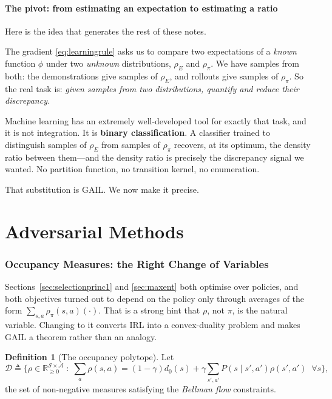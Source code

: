 \documentclass[11pt]{article}
\theoremstyle{plain}
\theoremstyle{definition}
\newtheorem{definition}[theorem]{Definition}
\theoremstyle{remark}
\renewcommand{\S}{\mathcal{S}}
\newcommand{\A}{\mathcal{A}}
\newcommand{\R}{\mathbb{R}}
\begin{document}
\subsection{The pivot: from estimating an expectation to estimating a ratio}

Here is the idea that generates the rest of these notes.

The gradient \eqref{eq:learningrule} asks us to compare two expectations
of a \emph{known} function $\phi$ under two \emph{unknown} distributions,
$\rho_E$ and $\rho_\pi$. We have samples from both: the demonstrations
give samples of $\rho_E$, and rollouts give samples of $\rho_\pi$. So the
real task is: \emph{given samples from two distributions, quantify and
reduce their discrepancy.}

Machine learning has an extremely well-developed tool for exactly that
task, and it is not integration. It is \textbf{binary classification}. A
classifier trained to distinguish samples of $\rho_E$ from samples of
$\rho_\pi$ recovers, at its optimum, the density ratio between
them---and the density ratio is precisely the discrepancy signal we
wanted. No partition function, no transition kernel, no enumeration.

That substitution is GAIL. We now make it precise.

\clearpage
\part{Adversarial Methods}\label{part:adversarial}

\section{Occupancy Measures: the Right Change of Variables}
\label{sec:occvar}

Sections~\ref{sec:selectionprinc1} and \ref{sec:maxent} both optimise over
policies, and both objectives turned out to depend on the policy only
through averages of the form $\sum_{s,a}\rho_\pi(s,a)(\cdot)$. That is a
strong hint that $\rho$, not $\pi$, is the natural variable. Changing to it
converts IRL into a convex-duality problem and makes GAIL a theorem rather
than an analogy.

\begin{definition}[The occupancy polytope]
Let
\begin{equation}
\mathcal{D} \triangleq \Big\{\rho\in\R^{\S\times\A}_{\ge0} \;:\;
\sum_a \rho(s,a) = (1-\gamma)d_0(s) + \gamma\sum_{s',a'} P(s\mid
s',a')\rho(s',a') \;\; \forall s\Big\},
\label{eq:occpolytope}
\end{equation}
the set of non-negative measures satisfying the \emph{Bellman flow}
constraints.
\end{definition}
\end{document}
